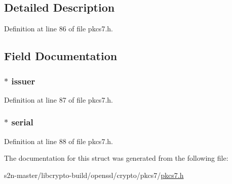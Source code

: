 \subsection{Detailed Description}


Definition at line 86 of file pkcs7.\+h.



\subsection{Field Documentation}
\subsubsection[{\texorpdfstring{issuer}{issuer}}]{ $\ast$ issuer}\hypertarget{structpkcs7__issuer__and__serial__st_a45017edc554e7984544678696c7a2e75}{}\label{structpkcs7__issuer__and__serial__st_a45017edc554e7984544678696c7a2e75}


Definition at line 87 of file pkcs7.\+h.

\subsubsection[{\texorpdfstring{serial}{serial}}]{ $\ast$ serial}\hypertarget{structpkcs7__issuer__and__serial__st_ae89753d950d21e4c15c296fced78c1b6}{}\label{structpkcs7__issuer__and__serial__st_ae89753d950d21e4c15c296fced78c1b6}


Definition at line 88 of file pkcs7.\+h.



The documentation for this struct was generated from the following file\+:\begin{DoxyCompactItemize}
\item 
s2n-\/master/libcrypto-\/build/openssl/crypto/pkcs7/\hyperlink{crypto_2pkcs7_2pkcs7_8h}{pkcs7.\+h}\end{DoxyCompactItemize}
